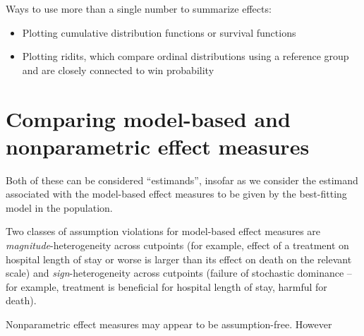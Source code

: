 \documentclass[
  11pt,
  fleqn
]{article}
\begin{document}
Ways to use more than a single number to summarize effects:

\begin{itemize}
  \item Plotting cumulative distribution functions or survival functions
  \item Plotting ridits, which compare ordinal distributions using a
    reference group and are closely connected to win probability
    \citep{brossHowUseRidit1958,agrestiAnalysisOrdinalCategorical2010,
      smithsonReceiverOperatingCharacteristic2023,
    jansenRiditAnalysisReview1984}
\end{itemize}

\section{Comparing model-based and nonparametric effect measures}
\label{sec:comparing}

Both of these can be considered ``estimands'', insofar as we consider the
estimand associated with the model-based effect measures to be given by the
best-fitting model in the population.

Two classes of assumption violations for model-based effect measures
are \emph{magnitude}-heterogeneity across cutpoints (for example,
  effect of a treatment on hospital length of stay or worse is larger
  than its effect on
death on the relevant scale) and
\emph{sign}-heterogeneity
across cutpoints (failure of stochastic dominance -- for example,
treatment is beneficial for hospital length of stay, harmful for death).

Nonparametric effect measures may appear to be assumption-free. However
\end{document}
